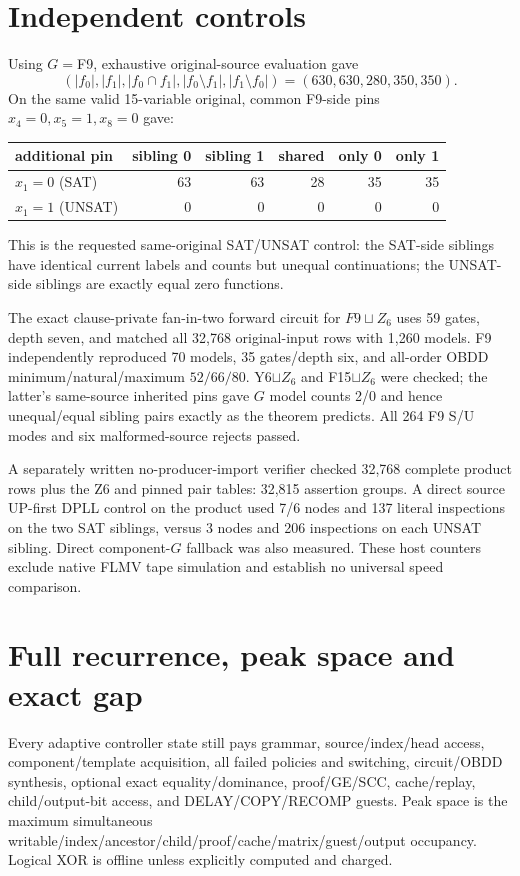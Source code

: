 \documentclass[11pt]{article}
\begin{document}
\section{Independent controls}
Using $G=$F9, exhaustive original-source evaluation gave
\[
(|f_0|,|f_1|,|f_0\cap f_1|,|f_0\setminus f_1|,|f_1\setminus f_0|)
=(630,630,280,350,350).
\]
On the same valid 15-variable original, common F9-side pins $x_4=0,x_5=1,x_8=0$ gave:
\begin{center}
\begin{tabular}{lrrrrr}
\toprule
additional pin & sibling 0 & sibling 1 & shared & only 0 & only 1\\
\midrule
$x_1=0$ (SAT) & 63&63&28&35&35\\
$x_1=1$ (UNSAT) & 0&0&0&0&0\\
\bottomrule
\end{tabular}
\end{center}
This is the requested same-original SAT/UNSAT control: the SAT-side siblings have identical current labels and counts but unequal continuations; the UNSAT-side siblings are exactly equal zero functions.

The exact clause-private fan-in-two forward circuit for $F9\sqcup Z_6$ uses 59 gates, depth seven, and matched all 32,768 original-input rows with 1,260 models. F9 independently reproduced 70 models, 35 gates/depth six, and all-order OBDD minimum/natural/maximum $52/66/80$. Y6$\sqcup Z_6$ and F15$\sqcup Z_6$ were checked; the latter's same-source inherited pins gave $G$ model counts 2/0 and hence unequal/equal sibling pairs exactly as the theorem predicts. All 264 F9 S/U modes and six malformed-source rejects passed.

A separately written no-producer-import verifier checked 32,768 complete product rows plus the Z6 and pinned pair tables: 32,815 assertion groups. A direct source UP-first DPLL control on the product used 7/6 nodes and 137 literal inspections on the two SAT siblings, versus 3 nodes and 206 inspections on each UNSAT sibling. Direct component-$G$ fallback was also measured. These host counters exclude native FLMV tape simulation and establish no universal speed comparison.

\section{Full recurrence, peak space and exact gap}
Every adaptive controller state still pays grammar, source/index/head access, component/template acquisition, all failed policies and switching, circuit/OBDD synthesis, optional exact equality/dominance, proof/GE/SCC, cache/replay, child/output-bit access, and DELAY/COPY/RECOMP guests. Peak space is the maximum simultaneous writable/index/ancestor/child/proof/cache/matrix/guest/output occupancy. Logical XOR is offline unless explicitly computed and charged.
\end{document}
